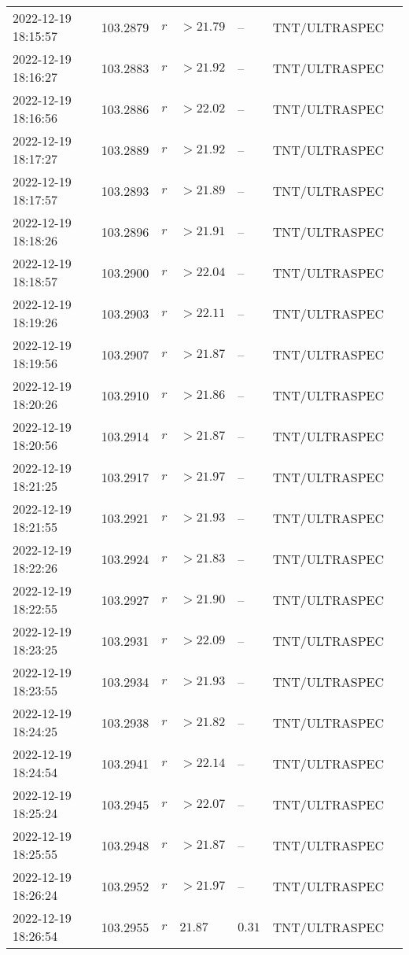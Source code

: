 \documentclass{nature_plusfigure}
\begin{document}
\begin{supplement}
\begin{center}
\begin{longtable}{lllllll}
2022-12-19 18:15:57 & 103.2879 & $r$ & $>21.79$ & -- & TNT/ULTRASPEC &  \\ 
2022-12-19 18:16:27 & 103.2883 & $r$ & $>21.92$ & -- & TNT/ULTRASPEC &  \\ 
2022-12-19 18:16:56 & 103.2886 & $r$ & $>22.02$ & -- & TNT/ULTRASPEC &  \\ 
2022-12-19 18:17:27 & 103.2889 & $r$ & $>21.92$ & -- & TNT/ULTRASPEC &  \\ 
2022-12-19 18:17:57 & 103.2893 & $r$ & $>21.89$ & -- & TNT/ULTRASPEC &  \\ 
2022-12-19 18:18:26 & 103.2896 & $r$ & $>21.91$ & -- & TNT/ULTRASPEC &  \\ 
2022-12-19 18:18:57 & 103.2900 & $r$ & $>22.04$ & -- & TNT/ULTRASPEC &  \\ 
2022-12-19 18:19:26 & 103.2903 & $r$ & $>22.11$ & -- & TNT/ULTRASPEC &  \\ 
2022-12-19 18:19:56 & 103.2907 & $r$ & $>21.87$ & -- & TNT/ULTRASPEC &  \\ 
2022-12-19 18:20:26 & 103.2910 & $r$ & $>21.86$ & -- & TNT/ULTRASPEC &  \\ 
2022-12-19 18:20:56 & 103.2914 & $r$ & $>21.87$ & -- & TNT/ULTRASPEC &  \\ 
2022-12-19 18:21:25 & 103.2917 & $r$ & $>21.97$ & -- & TNT/ULTRASPEC &  \\ 
2022-12-19 18:21:55 & 103.2921 & $r$ & $>21.93$ & -- & TNT/ULTRASPEC &  \\ 
2022-12-19 18:22:26 & 103.2924 & $r$ & $>21.83$ & -- & TNT/ULTRASPEC &  \\ 
2022-12-19 18:22:55 & 103.2927 & $r$ & $>21.90$ & -- & TNT/ULTRASPEC &  \\ 
2022-12-19 18:23:25 & 103.2931 & $r$ & $>22.09$ & -- & TNT/ULTRASPEC &  \\ 
2022-12-19 18:23:55 & 103.2934 & $r$ & $>21.93$ & -- & TNT/ULTRASPEC &  \\ 
2022-12-19 18:24:25 & 103.2938 & $r$ & $>21.82$ & -- & TNT/ULTRASPEC &  \\ 
2022-12-19 18:24:54 & 103.2941 & $r$ & $>22.14$ & -- & TNT/ULTRASPEC &  \\ 
2022-12-19 18:25:24 & 103.2945 & $r$ & $>22.07$ & -- & TNT/ULTRASPEC &  \\ 
2022-12-19 18:25:55 & 103.2948 & $r$ & $>21.87$ & -- & TNT/ULTRASPEC &  \\ 
2022-12-19 18:26:24 & 103.2952 & $r$ & $>21.97$ & -- & TNT/ULTRASPEC &  \\ 
2022-12-19 18:26:54 & 103.2955 & $r$ & $21.87$ & $0.31$ & TNT/ULTRASPEC &  \\ 

\end{longtable}
\end{center}
\end{supplement}
\end{document}
